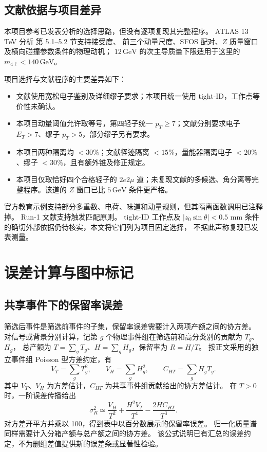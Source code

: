 \documentclass[11pt,a4paper,fontset=fandol,scheme=plain]{ctexart}
\newcommand{\gev}{\,\mathrm{GeV}}
\begin{document}
\subsection{文献依据与项目差异}
本项目参考已发表分析的选择思路，但没有逐项复现其完整程序。
ATLAS 13 TeV 分析\cite{ATLAS13} 第 5.1--5.2 节支持接受度、
前三个动量尺度、SFOS 配对、$Z$ 质量窗口及横向碰撞参数条件的物理动机；
$12\gev$ 的次主导质量下限适用于这里的 $m_{4\ell}<140\gev$。

项目选择与文献程序的主要差异如下：
\begin{itemize}[itemsep=1pt,topsep=2pt]
\item 文献使用宽松电子鉴别及详细缪子要求；本项目统一使用 tight-ID，工作点等价性未确认。
\item 本项目动量阈值允许取等号，第四轻子统一 $p_T\geq7$；文献分别要求电子 $E_T>7$、缪子 $p_T>5$，部分缪子另有要求。
\item 本项目两种隔离均 $<30\%$；文献径迹隔离 $<15\%$，量能器隔离电子 $<20\%$、缪子 $<30\%$，且有额外锥及修正规定。
\item 本项目仅取恰好四个合格轻子的 $2e2\mu$ 道；未复现文献的多候选、角分离等完整程序。该道的 $Z$ 窗口已比 $5\gev$ 条件更严格。
\end{itemize}
官方教育示例\cite{HZZCuts,HZZAnalysis}支持部分多重数、电荷、味道和动量规则，但其隔离函数调用已注释掉。
Run-1 文献\cite{ATLASRun1}支持触发匹配原则。
tight-ID 工作点及 $|z_0\sin\theta|<0.5$ mm 条件的确切外部依据仍待核实，本文将它们列为项目固定选择，
不据此声称复现已发表测量。
\FloatBarrier

\section{误差计算与图中标记}\label{app:errors}


\subsection{共享事件下的保留率误差}
筛选后事件是筛选前事件的子集，保留率误差需要计入两项产额之间的协方差。
对信号或背景分别计算，记第 $g$ 个物理事件组在筛选前和高分类别的贡献为 $T_g$、$H_g$，
总产额为 $T=\sum_g T_g$、$H=\sum_g H_g$，保留率为 $R=H/T$。
按正文采用的独立事件组 Poisson 型方差约定，有
\[
 V_T=\sum_g T_g^2,\qquad V_H=\sum_g H_g^2,\qquad C_{HT}=\sum_g H_gT_g.
\]
其中 $V_T$、$V_H$ 为方差估计，$C_{HT}$ 为共享事件组贡献给出的协方差估计。
在 $T>0$ 时，一阶误差传播给出
\[
 \sigma_R^2\simeq\frac{V_H}{T^2}+\frac{H^2V_T}{T^4}-\frac{2H C_{HT}}{T^3}.
\]
对方差开平方并乘以 100，得到表中以百分数展示的保留率误差。
归一化质量谱同样需要计入分箱产额与总产额之间的协方差。
该公式说明已有汇总的误差约定，不为删组差值提供新的误差条或显著性检验。
\end{document}
